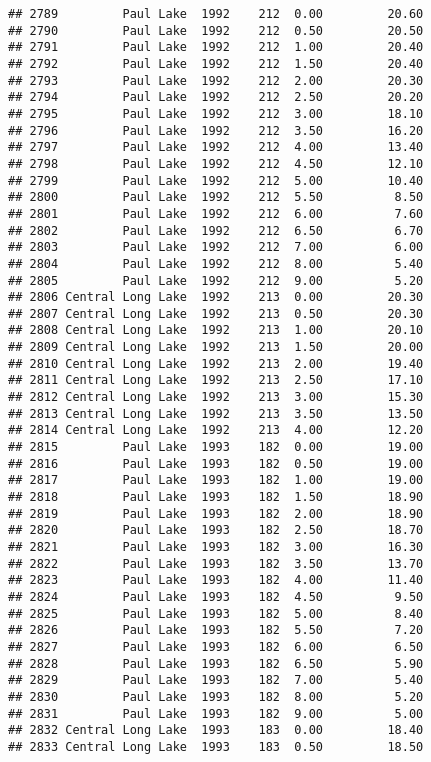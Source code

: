 \documentclass[
]{article}
\begin{document}
\begin{verbatim}
## 2789         Paul Lake  1992    212  0.00         20.60
## 2790         Paul Lake  1992    212  0.50         20.50
## 2791         Paul Lake  1992    212  1.00         20.40
## 2792         Paul Lake  1992    212  1.50         20.40
## 2793         Paul Lake  1992    212  2.00         20.30
## 2794         Paul Lake  1992    212  2.50         20.20
## 2795         Paul Lake  1992    212  3.00         18.10
## 2796         Paul Lake  1992    212  3.50         16.20
## 2797         Paul Lake  1992    212  4.00         13.40
## 2798         Paul Lake  1992    212  4.50         12.10
## 2799         Paul Lake  1992    212  5.00         10.40
## 2800         Paul Lake  1992    212  5.50          8.50
## 2801         Paul Lake  1992    212  6.00          7.60
## 2802         Paul Lake  1992    212  6.50          6.70
## 2803         Paul Lake  1992    212  7.00          6.00
## 2804         Paul Lake  1992    212  8.00          5.40
## 2805         Paul Lake  1992    212  9.00          5.20
## 2806 Central Long Lake  1992    213  0.00         20.30
## 2807 Central Long Lake  1992    213  0.50         20.30
## 2808 Central Long Lake  1992    213  1.00         20.10
## 2809 Central Long Lake  1992    213  1.50         20.00
## 2810 Central Long Lake  1992    213  2.00         19.40
## 2811 Central Long Lake  1992    213  2.50         17.10
## 2812 Central Long Lake  1992    213  3.00         15.30
## 2813 Central Long Lake  1992    213  3.50         13.50
## 2814 Central Long Lake  1992    213  4.00         12.20
## 2815         Paul Lake  1993    182  0.00         19.00
## 2816         Paul Lake  1993    182  0.50         19.00
## 2817         Paul Lake  1993    182  1.00         19.00
## 2818         Paul Lake  1993    182  1.50         18.90
## 2819         Paul Lake  1993    182  2.00         18.90
## 2820         Paul Lake  1993    182  2.50         18.70
## 2821         Paul Lake  1993    182  3.00         16.30
## 2822         Paul Lake  1993    182  3.50         13.70
## 2823         Paul Lake  1993    182  4.00         11.40
## 2824         Paul Lake  1993    182  4.50          9.50
## 2825         Paul Lake  1993    182  5.00          8.40
## 2826         Paul Lake  1993    182  5.50          7.20
## 2827         Paul Lake  1993    182  6.00          6.50
## 2828         Paul Lake  1993    182  6.50          5.90
## 2829         Paul Lake  1993    182  7.00          5.40
## 2830         Paul Lake  1993    182  8.00          5.20
## 2831         Paul Lake  1993    182  9.00          5.00
## 2832 Central Long Lake  1993    183  0.00         18.40
## 2833 Central Long Lake  1993    183  0.50         18.50

\end{verbatim}
\end{document}
